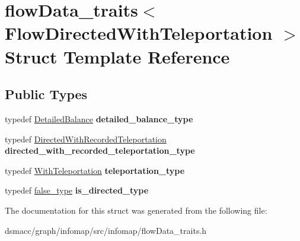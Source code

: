 \hypertarget{structflowData__traits_3_01FlowDirectedWithTeleportation_01_4}{}\section{flow\+Data\+\_\+traits$<$ Flow\+Directed\+With\+Teleportation $>$ Struct Template Reference}
\label{structflowData__traits_3_01FlowDirectedWithTeleportation_01_4}
\subsection*{Public Types}
\begin{DoxyCompactItemize}
\item 
\mbox{\label{structflowData__traits_3_01FlowDirectedWithTeleportation_01_4_a899dccc40c7e6c47ea87cfe1dcc53ece}} 
typedef \mbox{\hyperlink{structDetailedBalance}{Detailed\+Balance}} {\bfseries detailed\+\_\+balance\+\_\+type}
\item 
\mbox{\label{structflowData__traits_3_01FlowDirectedWithTeleportation_01_4_a661af3059fd371471899d51e56dd26ce}} 
typedef \mbox{\hyperlink{structDirectedWithRecordedTeleportation}{Directed\+With\+Recorded\+Teleportation}} {\bfseries directed\+\_\+with\+\_\+recorded\+\_\+teleportation\+\_\+type}
\item 
\mbox{\label{structflowData__traits_3_01FlowDirectedWithTeleportation_01_4_adbb45b22e0960b6d3349766bc05cf634}} 
typedef \mbox{\hyperlink{structWithTeleportation}{With\+Teleportation}} {\bfseries teleportation\+\_\+type}
\item 
\mbox{\label{structflowData__traits_3_01FlowDirectedWithTeleportation_01_4_a172dca3c6d1d6a03abdf98adf30aebf5}} 
typedef \mbox{\hyperlink{structfalse__type}{false\+\_\+type}} {\bfseries is\+\_\+directed\+\_\+type}
\end{DoxyCompactItemize}


The documentation for this struct was generated from the following file\+:\begin{DoxyCompactItemize}
\item 
dsmacc/graph/infomap/src/infomap/flow\+Data\+\_\+traits.\+h\end{DoxyCompactItemize}
